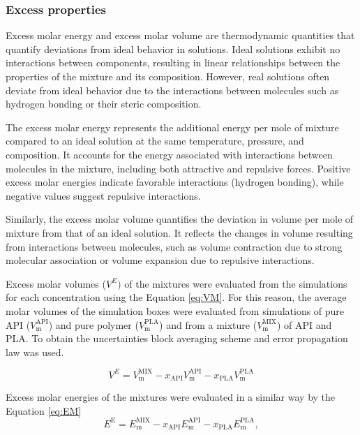 \subsubsection{Excess properties}
Excess molar energy and excess molar volume are thermodynamic quantities that quantify deviations from ideal behavior in solutions. Ideal solutions exhibit no interactions between components, resulting in linear relationships between the properties of the mixture and its composition. However, real solutions often deviate from ideal behavior due to the interactions between molecules such as hydrogen bonding or their steric composition.

The excess molar energy represents the additional energy per mole of mixture compared to an ideal solution at the same temperature, pressure, and composition. It accounts for the energy associated with interactions between molecules in the mixture, including both attractive and repulsive forces. Positive excess molar energies indicate favorable interactions (hydrogen bonding), while negative values suggest repulsive interactions.

Similarly, the excess molar volume quantifies the deviation in volume per mole of mixture from that of an ideal solution. It reflects the changes in volume resulting from interactions between molecules, such as volume contraction due to strong molecular association or volume expansion due to repulsive interactions.

Excess molar volumes ($V^{E})$ of the mixtures were evaluated from the simulations for each concentration using the Equation \ref{eq:VM}. For this reason, the average molar volumes of the simulation boxes were evaluated from simulations of pure API ($V_{\text{m}}^{\text{API}} $) and pure polymer ($V_{\text{m}}^{\text{PLA}}$) and from a mixture ($V_{\text{m}}^{\text{MIX}}$) of API and PLA. To obtain the uncertainties block averaging scheme and error propagation law was used. 
 

\begin{equation}\label{eq:VM}
	V^{E} = V_{\text{m}}^{\text{MIX}} - x_{\text{API}} V_{\text{m}}^{\text{API}} - x_{\text{PLA}} V_{\text{m}}^{\text{PLA}}
\end{equation}

Excess molar energies of the mixtures were evaluated in a similar way by the Equation \ref{eq:EM}
\begin{equation}\label{eq:EM}
	E^\text{E} = E_{\text{m}}^{\text{MIX}} - x_{\text{API}} E_{\text{m}}^{\text{API}} - x_{\text{PLA}} E_{\text{m}}^{\text{PLA}},
\end{equation}

